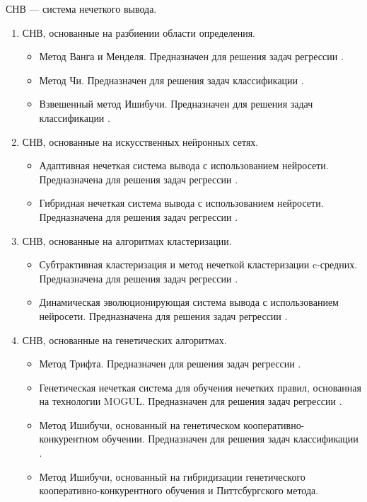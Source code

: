 \documentclass[a4paper,14pt]{article}
\begin{document}
СНВ --- система нечеткого вывода.
\begin{enumerate}
\item СНВ, основанные на разбиении области определения.
\begin{itemize}
\item Метод Ванга и Менделя. Предназначен для решения задач регрессии \cite{Wang1992}.
\item Метод Чи. Предназначен для решения задач классификации \cite{Chi1996}.
\item Взвешенный метод Ишибучи. Предназначен для решения задач классификации \cite{Ishibuchi2001}.
\end{itemize}
\item СНВ, основанные на искусственных нейронных сетях.
\begin{itemize}
	\item Адаптивная нечеткая система вывода с использованием нейросети. Предназначена для решения задач регрессии \cite{Jan1993}. 
	\item Гибридная нечеткая система вывода с использованием нейросети.  Предназначена для решения задач регрессии \cite{Kim1999}.
\end{itemize}
\item СНВ, основанные на алгоритмах кластеризации.
\begin{itemize}
	\item Субтрактивная кластеризация и метод нечеткой кластеризации c-средних.
	Предназначена для решения задач регрессии \cite{Chiu1996}.
	\item Динамическая эволюционирующая система вывода с использованием нейросети. Предназначена для решения задач регрессии \cite{Kasabov2002}.
\end{itemize}	
\item СНВ, основанные на генетических алгоритмах.
\begin{itemize}
	\item Метод Трифта. Предназначен для решения задач регрессии \cite{Thrift1991}.
	\item Генетическая нечеткая система для обучения нечетких правил, основанная на технологии MOGUL. Предназначен для решения задач регрессии \cite{Cordon1999}.
	\item Метод Ишибучи, основанный на генетическом кооперативно-кон\-курентном обучении. Предназначен для решения задач классификации \cite{Ishibuchi1999}.
	\item Метод Ишибучи, основанный на гибридизации генетического ко\-оперативно-конкурентного обучения и Питтсбургского метода. 

\end{itemize}
\end{enumerate}
\end{document}
